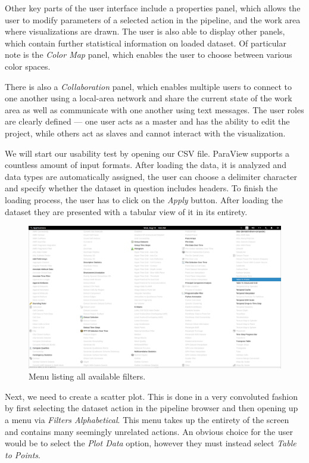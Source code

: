 \documentclass[thesis=M,english,hidelinks]{FITthesisXE}[2012/06/26]
\begin{document}
Other key parts of the user interface include a properties panel, which allows the user to modify parameters of a selected action in the pipeline, and the work area where visualizations are drawn. The user is also able to display other panels, which contain further statistical information on loaded dataset. Of particular note is the \emph{Color Map} panel, which enables the user to choose between various color spaces. 

There is also a \emph{Collaboration} panel, which enables multiple users to connect to one another using a local-area network and share the current state of the work area as well as communicate with one another using text messages. The user roles are clearly defined --- one user acts as a master and has the ability to edit the project, while others act as slaves and cannot interact with the visualization.

We will start our usability test by opening our CSV file. ParaView supports a countless amount of input formats. After loading the data, it is analyzed and data types are automatically assigned, the user can choose a delimiter character and specify whether the dataset in question includes headers. To finish the loading process, the user has to click on the \emph{Apply} button. After loading the dataset they are presented with a tabular view of it in its entirety.

\begin{figure}[ht]
\centering
\includegraphics[scale=0.2]{paraview_menu}
\caption{Menu listing all available filters.}
\label{fig:paraview_menu}
\end{figure}

Next, we need to create a scatter plot. This is done in a very convoluted fashion by first selecting the dataset action in the pipeline browser and then opening up a menu via \emph{Filters \textrightarrow{} Alphabetical}. This menu takes up the entirety of the screen and contains many seemingly unrelated actions. An obvious choice for the user would be to select the \emph{Plot Data} option, however they must instead select \emph{Table to Points}.
\end{document}
